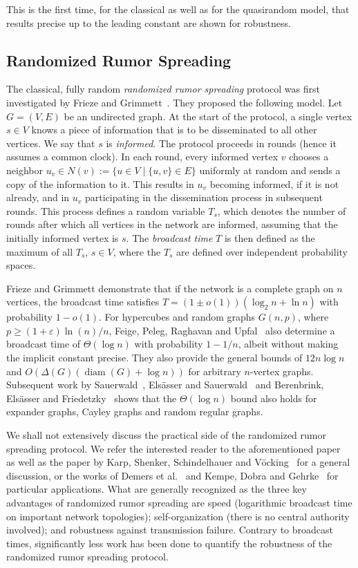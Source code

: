 \documentclass[12pt]{article}
\newcommand{\eps}{\varepsilon}
\DeclareMathOperator{\diam}{diam}
\begin{document}
{  This is the first time, for the classical as well as for the quasirandom model, that results precise up to the leading constant are shown for robustness. 
  
\subsection{Randomized Rumor Spreading}

  The classical, fully random \emph{randomized rumor spreading} protocol was first investigated by Frieze and Grimmett~\cite{FG85}. They proposed the following model. Let $G = (V, E)$ be an undirected graph. At the start of the protocol, a single vertex $s \in V$ knows a piece of information that is to be disseminated to all other vertices. We say that $s$ is \emph{informed}. The protocol proceeds in rounds (hence it assumes a common clock). In each round, every informed vertex $v$ chooses a neighbor $u_v \in N(v) := \{u \in V \mid \{u,v\} \in E\}$ uniformly at random and sends a copy of the information to it. This results in $u_v$ becoming informed, if it is not already, and in $u_v$ participating in the dissemination process in subsequent rounds. This process defines a random variable $T_s$, which denotes the number of rounds after which all vertices in the network are informed, assuming that the initially informed vertex is $s$. The \emph{broadcast time} $T$ is then defined as the maximum of all $T_s$, $s \in V$, where the $T_s$ are defined over independent probability spaces.
  
  Frieze and Grimmett demonstrate that if the network is a complete graph on $n$ vertices, the broadcast time satisfies $T = (1 \pm o(1)) (\log_2 n + \ln n)$ with probability $1 - o(1)$. For hypercubes and random graphs $G(n,p)$, where $p \ge (1 + \eps) \ln(n)/n$, Feige, Peleg, Raghavan and Upfal~\cite{FPRU90} also determine a broadcast time of $\Theta(\log n)$ with probability $1 - 1/n$, albeit without making the implicit constant precise. They also provide the general bounds of $12 n \log n$ and $O(\Delta(G) (\diam(G)+ \log n))$ for arbitrary $n$-vertex graphs. Subsequent work by Sauerwald~\cite{S07}, Els\"asser and Sauerwald~\cite{ES07} and Berenbrink, Els\"asser and Friedetzky~\cite{BEF08} shows that the $\Theta(\log n)$ bound also holds for expander graphs, Cayley graphs and random regular graphs.
  
  We shall not extensively discuss the practical side of the randomized rumor spreading protocol. We refer the interested reader to the aforementioned paper~\cite{FPRU90} as well as the paper by Karp, Shenker, Schindelhauer and V\"ocking~\cite{KSSV00} for a general discussion, or the works of Demers et al.~\cite{DGH+88} and Kempe, Dobra and Gehrke~\cite{KDG03} for particular applications. What are generally recognized as the three key advantages of randomized rumor spreading are speed (logarithmic broadcast time on important network topologies); self-organization (there is no central authority involved); and robustness against transmission failure. Contrary to broadcast times, significantly less work has been done to quantify the robustness of the randomized rumor spreading protocol.
  
}
\end{document}
